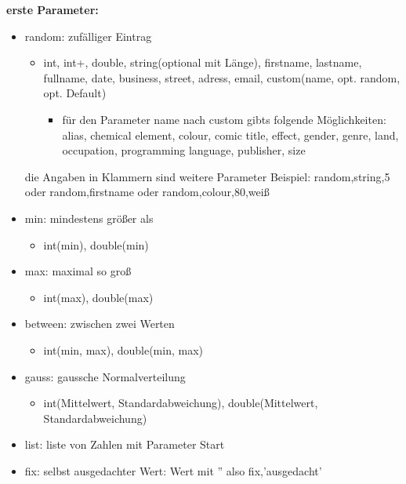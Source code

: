 \documentclass[11pt]{report}
\begin{document}
\bigskip\noindent
\textbf{erste Parameter:}
\begin{itemize}

\item random: zufälliger Eintrag
\begin{itemize}
\item	int, int+, double, string(optional mit Länge), firstname, lastname, fullname, date, business, street, adress, email, custom(name, opt. random, opt. Default)
\begin{itemize}
\item	für den Parameter name nach custom gibts folgende Möglichkeiten: alias, chemical element, colour, comic title, effect, gender, genre, land, occupation, programming language, publisher, size
\end{itemize}
\end{itemize}

die Angaben in Klammern sind weitere Parameter
Beispiel: random,string,5 oder random,firstname oder random,colour,80,weiß

\item min: mindestens größer als
\begin{itemize}
\item int(min), double(min)
\end{itemize}

\item max: maximal so groß
\begin{itemize}
\item int(max), double(max)
\end{itemize}

\item between: zwischen zwei Werten
\begin{itemize}
\item int(min, max), double(min, max)
\end{itemize}
	

\item gauss: gaussche Normalverteilung
\begin{itemize}
\item int(Mittelwert, Standardabweichung), double(Mittelwert, Standardabweichung)
\end{itemize}


\item list: liste von Zahlen mit Parameter Start

\item fix: selbst ausgedachter Wert: Wert mit '' also fix,'ausgedacht'
\end{itemize}
\end{document}
